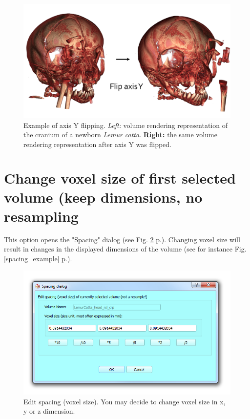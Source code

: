\begin{figure}
  \centering
  \includegraphics[scale=0.35]{images/14/flip_swap/flip_y_example.png}
\caption{ Example of axis Y flipping. \textit{Left:} volume rendering representation of the cranium of a newborn \textit{Lemur catta}.\textbf{ Right:} the same volume rendering representation after axis Y was flipped.}	
\label{flip_y_example}
 \end{figure}



\section{Change voxel size of first selected volume (keep dimensions, no resampling}

This option opens the "Spacing" dialog (see Fig. \ref{spacing_dialog} p.\pageref{spacing_dialog}). Changing voxel size will result in changes in the displayed dimensions of the volume (see for instance Fig. \ref{spacing_example} p.\pageref{spacing_example}).
 
\begin{figure}
  \centering
  \includegraphics[scale=0.5]{images/14/spacing/spacing_dialog.png}
\caption{Edit spacing (voxel size). You may decide to change voxel size in x, y or z dimension.}	
\label{spacing_dialog}
 \end{figure}


